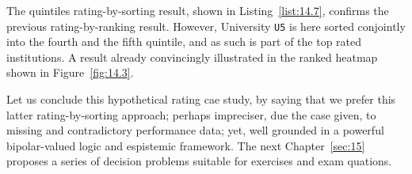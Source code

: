 The quintiles rating-by-sorting result, shown in Listing~\vref{list:14.7}, confirms the previous \Copeland rating-by-ranking result. However, University \texttt{U5} is here sorted conjointly into the fourth and the fifth quintile, and as such is part of the top rated institutions. A result already convincingly illustrated in the ranked heatmap shown in Figure~\vref{fig:14.3}. 

\vspace{1cm}

Let us conclude this hypothetical rating cae study, by saying that we prefer this latter rating-by-sorting approach; perhaps impreciser, due the case given, to missing and contradictory performance data; yet, well grounded in a powerful bipolar-valued logic and espistemic framework. The next Chapter~\ref{sec:15} proposes a series of decision problems suitable for exercises and exam quations.
 


%